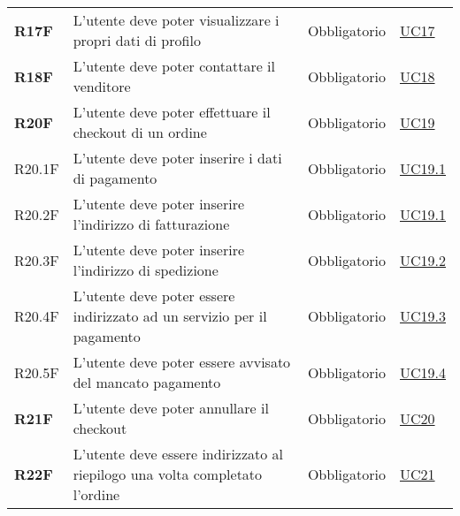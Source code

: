 \begin{center}
\begin{longtable}[!h]{p{50px} p{210px} p{80px} p{50px}}
        \textbf{R17F}                         & L'utente deve poter visualizzare i propri dati di profilo                                           & Obbligatorio             & \hyperref[sec:UC17]{UC17}                    \\
        \textbf{R18F}                         & L'utente deve poter contattare il venditore                                                         & Obbligatorio             & \hyperref[sec:UC18]{UC18}                    \\
        \textbf{R20F}                         & L'utente deve poter effettuare il checkout di un ordine                                             & Obbligatorio             & \hyperref[sec:UC19]{UC19}                    \\
        R20.1F                                & L'utente deve poter inserire i dati di pagamento                                                    & Obbligatorio             & \hyperref[sec:UC19.1]{UC19.1}                \\
        R20.2F                                & L'utente deve poter inserire l'indirizzo di fatturazione                                            & Obbligatorio             & \hyperref[sec:UC19.1]{UC19.1}                \\
        R20.3F                                & L'utente deve poter inserire l'indirizzo di spedizione                                              & Obbligatorio             & \hyperref[sec:UC19.2]{UC19.2}                \\
        R20.4F                                & L'utente deve poter essere indirizzato ad un servizio per il pagamento                              & Obbligatorio             & \hyperref[sec:UC19.3]{UC19.3}                \\
        R20.5F                                & L'utente deve poter essere avvisato del mancato pagamento                                           & Obbligatorio             & \hyperref[sec:UC19.4]{UC19.4}                \\
        \textbf{R21F}                         & L'utente deve poter annullare il checkout                                                           & Obbligatorio             & \hyperref[sec:UC20]{UC20}                    \\
        \textbf{R22F}                         & L'utente deve essere indirizzato al riepilogo una volta completato l'ordine                         & Obbligatorio             & \hyperref[sec:UC21]{UC21}                    \\

\end{longtable}
\end{center}
